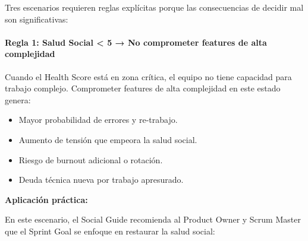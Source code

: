 Tres escenarios requieren reglas explícitas porque las consecuencias de decidir mal son significativas:

\paragraph{Regla 1: Salud Social < 5 → No comprometer features de alta complejidad}

Cuando el Health Score está en zona crítica, el equipo no tiene capacidad para trabajo complejo. Comprometer features de alta complejidad en este estado genera:

\begin{itemize}
    \item Mayor probabilidad de errores y re-trabajo.
    \item Aumento de tensión que empeora la salud social.
    \item Riesgo de burnout adicional o rotación.
    \item Deuda técnica nueva por trabajo apresurado.
\end{itemize}

\textbf{Aplicación práctica:}

En este escenario, el Social Guide recomienda al Product Owner y Scrum Master que el Sprint Goal se enfoque en restaurar la salud social:

